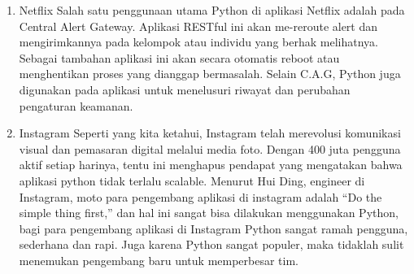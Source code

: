 \begin{enumerate}
    \item Netflix
Salah satu penggunaan utama Python di aplikasi Netflix adalah pada Central Alert Gateway. Aplikasi RESTful ini akan me-reroute alert dan mengirimkannya pada kelompok atau individu yang berhak melihatnya. Sebagai tambahan aplikasi ini akan secara otomatis reboot atau menghentikan proses yang dianggap bermasalah. Selain C.A.G, Python juga digunakan pada aplikasi untuk menelusuri riwayat dan perubahan pengaturan keamanan.

    \item Instagram
Seperti yang kita ketahui, Instagram telah merevolusi komunikasi visual dan pemasaran digital melalui media foto. Dengan 400 juta pengguna aktif setiap harinya, tentu ini menghapus pendapat yang mengatakan bahwa aplikasi python tidak terlalu scalable. Menurut Hui Ding, engineer di Instagram, moto para pengembang aplikasi di instagram adalah “Do the simple thing first,” dan hal ini sangat bisa dilakukan menggunakan Python, bagi para pengembang aplikasi di Instagram Python sangat ramah pengguna, sederhana dan rapi. Juga karena Python sangat populer, maka tidaklah sulit menemukan pengembang baru untuk memperbesar tim.


\end{enumerate}
